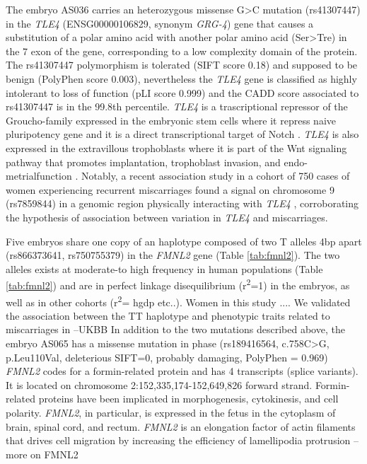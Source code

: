 \documentclass[fleqn,10pt]{wlscirep}
\begin{document}
The embryo AS036 carries an heterozygous missense G>C mutation (rs41307447) in the \textit{TLE4} (ENSG00000106829, synonym \textit{GRG-4}) gene that causes a substitution of a polar amino acid with another polar amino acid (Ser>Tre) in the 7 exon of the gene, corresponding to a low complexity domain of the protein. The rs41307447 polymorphism is tolerated (SIFT score 0.18) and supposed to be benign (PolyPhen score 0.003), nevertheless the \textit{TLE4} gene is classified as highly intolerant to loss of function (pLI score 0.999) and the CADD score associated to rs41307447 is in the 99.8th percentile. 
\textit{TLE4} is a trascriptional repressor of the Groucho-family expressed in the embryonic stem cells where it repress naive pluripotency gene \cite{laing2015gro} and it is a direct transcriptional target of Notch \cite{menchero2019transitions}. \textit{TLE4} is also expressed in the extravillous trophoblasts \cite{meinhardt2014wnt} where it is part of the Wnt signaling pathway that promotes implantation, trophoblast invasion, and endo-metrialfunction \cite{sonderegger2010wnt}. Notably, a recent association study in a cohort of 750 cases of women experiencing recurrent miscarriages found a signal on chromosome 9 (rs7859844) in a genomic region physically interacting with \textit{TLE4} \cite{laisk2019genetic}, corroborating the hypothesis of association between variation in \textit{TLE4} and miscarriages. 

Five embryos share one copy of an haplotype composed of two T alleles 4bp apart (rs866373641, rs750755379) in the \textit{FMNL2} gene (Table \ref{tab:fmnl2}). The two alleles exists at moderate-to high frequency in human populations (Table \ref{tab:fmnl2}) and are in perfect linkage disequilibrium (r\textsuperscript{2}=1) in the embryos, as well as in other cohorts (r\textsuperscript{2}= hgdp etc..). Women in this study .... 
We validated the association between the TT haplotype and phenotypic traits related to miscarriages in --UKBB 
In addition to the two mutations described above, the embryo AS065 has a missense mutation in phase (rs189416564, c.758C>G, p.Leu110Val, deleterious SIFT=0, probably damaging, PolyPhen = 0.969) 
\textit{FMNL2} codes for a formin-related protein and has 4 transcripts (splice variants). It is located on chromosome 2:152,335,174-152,649,826 forward strand. Formin-related proteins have been implicated in morphogenesis, cytokinesis, and cell polarity. \textit{FMNL2}, in particular, is expressed in the fetus in the cytoplasm of brain, spinal cord, and rectum\cite{lizio2015gateways}. \textit{FMNL2} is an elongation factor of actin filaments that drives cell migration by increasing the efficiency of lamellipodia protrusion \cite{block2012fmnl2} --more on FMNL2
\end{document}
